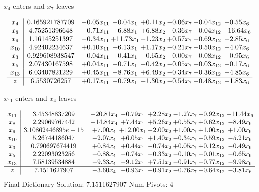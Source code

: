 \documentclass[9pt]{article}
\begin{document}
 $ x_{4} $ enters and $ x_{7} $ leaves 

 \[\begin{array}{c| c c@{\hskip 2pt} c@{\hskip 2pt} c@{\hskip 2pt} c@{\hskip 2pt} c@{\hskip 2pt} c@{\hskip 2pt} }
 x_{4}   &  0.165921787709 & -0.05 x_{11} & -0.04 x_{1} & +  0.11 x_{2} & -0.06 x_{7} & -0.04 x_{12} & -0.55 x_{6}\\
 x_{8}   &  4.75251396648 & -0.71 x_{11} & +  6.88 x_{1} & +  6.88 x_{2} & -0.36 x_{7} & -0.04 x_{12} & -16.64 x_{6}\\
 x_{9}   &  1.16145251397 & -0.34 x_{11} & + 11.73 x_{1} & -1.23 x_{2} & +  0.57 x_{7} & +  0.69 x_{12} & -2.85 x_{6}\\
 x_{10}   &  4.92402234637 & +  0.10 x_{11} & +  6.13 x_{1} & +  1.17 x_{2} & -0.21 x_{7} & -0.50 x_{12} & -4.07 x_{6}\\
 x_{3}   &  0.929608938547 & -0.04 x_{11} & +  0.41 x_{1} & -0.65 x_{2} & -0.00 x_{7} & +  0.08 x_{12} & -0.95 x_{6}\\
 x_{5}   &  2.07430167598 & +  0.04 x_{11} & -0.71 x_{1} & -0.42 x_{2} & -0.05 x_{7} & +  0.03 x_{12} & -0.17 x_{6}\\
 x_{13}   &  6.03407821229 & +  0.45 x_{11} & -8.76 x_{1} & +  6.49 x_{2} & -0.34 x_{7} & -0.36 x_{12} & -4.85 x_{6}\\
\hline
z    &  6.5530726257 & +  0.17 x_{11} & -0.79 x_{1} & -1.30 x_{2} & -0.54 x_{7} & -0.48 x_{12} & -1.83 x_{6}\\
\end{array}\]


 $ x_{11} $ enters and $ x_{4} $ leaves 

 \[\begin{array}{c| c c@{\hskip 2pt} c@{\hskip 2pt} c@{\hskip 2pt} c@{\hskip 2pt} c@{\hskip 2pt} c@{\hskip 2pt} }
 x_{11}   &  3.45348837209 & -20.81 x_{4} & -0.79 x_{1} & +  2.28 x_{2} & -1.27 x_{7} & -0.92 x_{12} & -11.44 x_{6}\\
 x_{8}   &  2.29069767442 & + 14.84 x_{4} & +  7.44 x_{1} & +  5.26 x_{2} & +  0.55 x_{7} & +  0.62 x_{12} & -8.49 x_{6}\\
 x_{9}   &  3.10862446895e-15 & +  7.00 x_{4} & + 12.00 x_{1} & -2.00 x_{2} & +  1.00 x_{7} & +  1.00 x_{12} & +  1.00 x_{6}\\
 x_{10}   &  5.26744186047 & -2.07 x_{4} & +  6.05 x_{1} & +  1.40 x_{2} & -0.34 x_{7} & -0.59 x_{12} & -5.21 x_{6}\\
 x_{3}   &  0.790697674419 & +  0.84 x_{4} & +  0.44 x_{1} & -0.74 x_{2} & +  0.05 x_{7} & +  0.12 x_{12} & -0.49 x_{6}\\
 x_{5}   &  2.22093023256 & -0.88 x_{4} & -0.74 x_{1} & -0.33 x_{2} & -0.10 x_{7} & -0.01 x_{12} & -0.65 x_{6}\\
 x_{13}   &  7.58139534884 & -9.33 x_{4} & -9.12 x_{1} & +  7.51 x_{2} & -0.91 x_{7} & -0.77 x_{12} & -9.98 x_{6}\\
\hline
z    &  7.1511627907 & -3.60 x_{4} & -0.93 x_{1} & -0.91 x_{2} & -0.76 x_{7} & -0.64 x_{12} & -3.81 x_{6}\\
\end{array}\]
Final Dictionary
Solution:  7.1511627907
Num Pivots:  4
\end{document}
